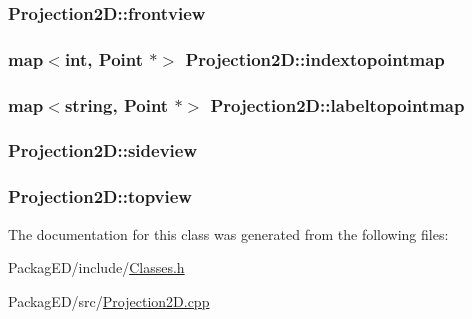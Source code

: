\subsubsection[{\texorpdfstring{frontview}{frontview}}]{ Projection2\+D\+::frontview}\hypertarget{class_projection2_d_a1eb4d010190b1bd62bf0f9c4e4afc88a}{}\label{class_projection2_d_a1eb4d010190b1bd62bf0f9c4e4afc88a}
\subsubsection[{\texorpdfstring{indextopointmap}{indextopointmap}}]{\setlength{\rightskip}{0pt plus 5cm}map$<$int, {\bf Point} $\ast$$>$ Projection2\+D\+::indextopointmap}\hypertarget{class_projection2_d_a08675aad4022218dc78dd54187be18a9}{}\label{class_projection2_d_a08675aad4022218dc78dd54187be18a9}
\subsubsection[{\texorpdfstring{labeltopointmap}{labeltopointmap}}]{\setlength{\rightskip}{0pt plus 5cm}map$<$string, {\bf Point} $\ast$$>$ Projection2\+D\+::labeltopointmap}\hypertarget{class_projection2_d_a0afd92ccd321bc86e6e019b4bec99fc8}{}\label{class_projection2_d_a0afd92ccd321bc86e6e019b4bec99fc8}
\subsubsection[{\texorpdfstring{sideview}{sideview}}]{ Projection2\+D\+::sideview}\hypertarget{class_projection2_d_a82c9e3f197b07ffe9a10f59de60edbee}{}\label{class_projection2_d_a82c9e3f197b07ffe9a10f59de60edbee}
\subsubsection[{\texorpdfstring{topview}{topview}}]{ Projection2\+D\+::topview}\hypertarget{class_projection2_d_a90079954379a766f60ba01ad393327ab}{}\label{class_projection2_d_a90079954379a766f60ba01ad393327ab}


The documentation for this class was generated from the following files\+:\begin{DoxyCompactItemize}
\item 
Packag\+E\+D/include/\hyperlink{_classes_8h}{Classes.\+h}\item 
Packag\+E\+D/src/\hyperlink{_projection2_d_8cpp}{Projection2\+D.\+cpp}\end{DoxyCompactItemize}
